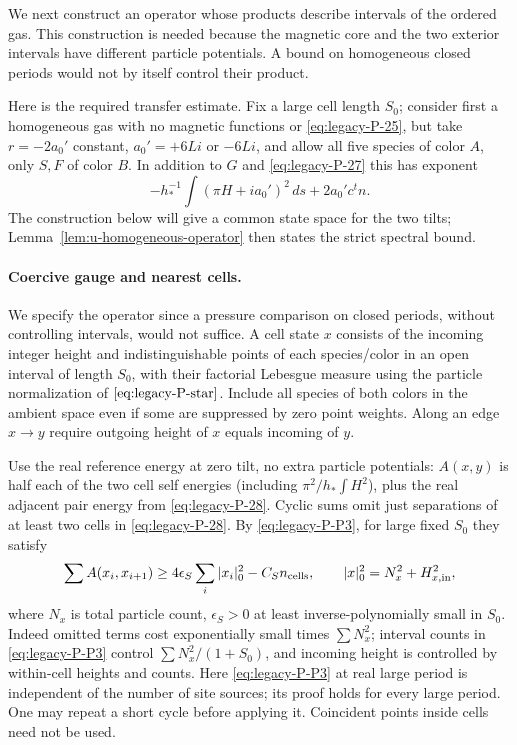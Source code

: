We next construct an operator whose products describe intervals of the
ordered gas.  This construction is needed because the magnetic core and
the two exterior intervals have different particle potentials.  A bound
on homogeneous closed periods would not by itself control their product.

Here is the required transfer estimate. Fix a large cell length \(S_0\); consider first a homogeneous gas with no magnetic functions or \eqref{eq:legacy-P-25}, but take \(r=-2a_0'\) constant, \(a_0'=+6Li\) or \(-6Li\), and allow all five species of color \(A\), only \(S,F\) of color \(B\). In addition to \(G\) and \eqref{eq:legacy-P-27} this has exponent
\begin{equation}
 -h_*^{-1}\int(\pi H+i a_0')^2\,ds
 + 2a_0' c^t n.
 \label{eq:legacy-P-29}
\end{equation}
The construction below will give a common state space for the two tilts; Lemma~\ref{lem:u-homogeneous-operator} then states the strict spectral bound.



\paragraph{Coercive gauge and nearest cells.}
We specify the operator since a pressure comparison on closed periods, without controlling intervals, would not suffice. A cell state \(x\) consists of the incoming integer height and indistinguishable points of each species/color in an open interval of length \(S_0\), with their factorial Lebesgue measure using the particle normalization of \(\eqref{eq:legacy-P-star}\). Include all species of both colors in the ambient space even if some are suppressed by zero point weights. Along an edge \(x\to y\) require outgoing height of \(x\) equals incoming of \(y\).

Use the real reference energy at zero tilt, no extra particle potentials: \(A(x,y)\) is half each of the two cell self energies (including \(\pi^2/h_*\int H^2\)), plus the real adjacent pair energy from \eqref{eq:legacy-P-28}. Cyclic sums omit just separations of at least two cells in \eqref{eq:legacy-P-28}. By \eqref{eq:legacy-P-P3}, for large fixed \(S_0\) they satisfy
\begin{equation}
 \sum A(x_i,x_{i+1})\ge 4\epsilon_S\sum_i |x_i|_0^2-C_S n_{\rm cells},
 \qquad |x|_0^2=N_x^2+H_{x,\rm in}^2 ,
 \label{eq:legacy-P-30}
\end{equation}
where \(N_x\) is total particle count, \(\epsilon_S>0\) at least inverse-polynomially small in \(S_0\). Indeed omitted terms cost exponentially small times \(\sum N_x^2\); interval counts in \eqref{eq:legacy-P-P3} control \(\sum N_x^2/(1+S_0)\), and incoming height is controlled by within-cell heights and counts. Here \eqref{eq:legacy-P-P3} at real large period is independent of the number of site sources; its proof holds for every large period. One may repeat a short cycle before applying it. Coincident points inside cells need not be used.




